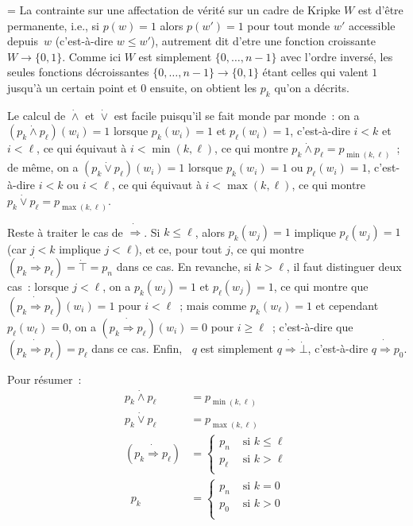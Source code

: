 \documentclass[12pt,a4paper]{article}
\theoremstyle{definition}
\newcommand{\dottedlimp}{\mathbin{\dot\Rightarrow}}
\newcommand{\dottedland}{\mathbin{\dot\land}}
\newcommand{\dottedlor}{\mathbin{\dot\lor}}
\newcommand{\dottedtop}{\mathord{\dot\top}}
\newcommand{\dottedbot}{\mathord{\dot\bot}}
\newcommand{\dottedneg}{\mathop{\dot\neg}}
\newif\ifcorrige
\newenvironment{corrige}%
{\ifcorrige\relax\else\setbox0=\vbox\bgroup\fi%
\smallbreak\footnotesize\noindent{\underbar{\textit{Corrigé.}}\quad}}
{{\hbox{}\nobreak\hfill\checkmark}%
\ifcorrige\relax\else\egroup\fi\par}
\begin{document}
\begin{corrige}
La contrainte sur une affectation de vérité sur un cadre de Kripke $W$
est d'être permanente, i.e., si $p(w)=1$ alors $p(w')=1$ pour tout
monde $w'$ accessible depuis $w$ (c'est-à-dire $w\leq w'$), autrement
dit d'etre une fonction croissante $W \to \{0,1\}$.  Comme ici $W$ est
simplement $\{0,\ldots,n-1\}$ avec l'ordre inversé, les seules
fonctions décroissantes $\{0,\ldots,n-1\} \to \{0,1\}$ étant celles
qui valent $1$ jusqu'à un certain point et $0$ ensuite, on obtient les
$p_k$ qu'on a décrits.

Le calcul de $\dottedland$ et $\dottedlor$ est facile puisqu'il se
fait monde par monde : on a $(p_k \dottedland p_\ell)(w_i) = 1$
lorsque $p_k(w_i) = 1$ et $p_\ell(w_i) = 1$, c'est-à-dire $i<k$ et
$i<\ell$, ce qui équivaut à $i<\min(k,\ell)$, ce qui montre $p_k
\dottedland p_\ell = p_{\min(k,\ell)}$ ; de même, on a $(p_k
\dottedlor p_\ell)(w_i) = 1$ lorsque $p_k(w_i) = 1$ ou $p_\ell(w_i) =
1$, c'est-à-dire $i<k$ ou $i<\ell$, ce qui équivaut à
$i<\max(k,\ell)$, ce qui montre $p_k \dottedlor p_\ell =
p_{\max(k,\ell)}$.

Reste à traiter le cas de $\dottedlimp$.  Si $k\leq\ell$, alors
$p_k(w_j) = 1$ implique $p_\ell(w_j) = 1$ (car $j<k$ implique
$j<\ell$), et ce, pour tout $j$, ce qui montre $(p_k\dottedlimp
p_\ell) = \dottedtop = p_n$ dans ce cas.  En revanche, si $k>\ell$, il
faut distinguer deux cas : lorsque $j<\ell$, on a $p_k(w_j) = 1$ et
$p_\ell(w_j) = 1$, ce qui montre que $(p_k\dottedlimp p_\ell)(w_i) =
1$ pour $i<\ell$ ; mais comme $p_k(w_\ell) = 1$ et cependant
$p_\ell(w_\ell) = 0$, on a $(p_k\dottedlimp p_\ell)(w_i) = 0$ pour
$i\geq \ell$ ; c'est-à-dire que $(p_k\dottedlimp p_\ell) = p_\ell$
dans ce cas.  Enfin, $\dottedneg q$ est simplement $q\dottedlimp
\dottedbot$, c'est-à-dire $q\dottedlimp p_0$.

Pour résumer :
\[
\begin{aligned}
p_k \dottedland p_\ell &= p_{\min(k,\ell)} \\
p_k \dottedlor p_\ell &= p_{\max(k,\ell)} \\
(p_k \dottedlimp p_\ell) &=
\left\{
\begin{array}{ll}
p_n&\text{~si $k\leq\ell$}\\
p_\ell&\text{~si $k>\ell$}\\
\end{array}
\right.
\\
\dottedneg p_k &=
\left\{
\begin{array}{ll}
p_n&\text{~si $k=0$}\\
p_0&\text{~si $k>0$}\\
\end{array}
\right.
\end{aligned}
\]


\end{corrige}
\end{document}
